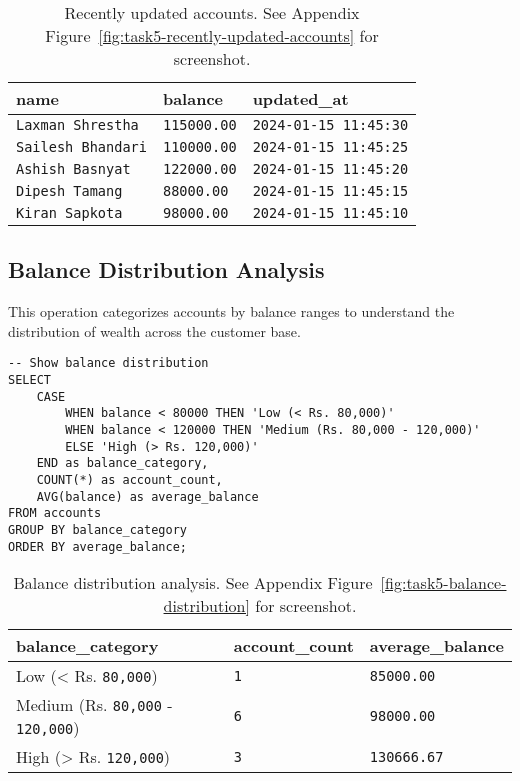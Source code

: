 \begin{table}[H]
  \centering
  \begin{tabular}{|l|l|l|}
    \hline
    \textbf{name} & \textbf{balance} & \textbf{updated\_at} \\
    \hline
    \texttt{Laxman Shrestha} & \texttt{115000.00} & \texttt{2024-01-15 11:45:30} \\
    \texttt{Sailesh Bhandari} & \texttt{110000.00} & \texttt{2024-01-15 11:45:25} \\
    \texttt{Ashish Basnyat} & \texttt{122000.00} & \texttt{2024-01-15 11:45:20} \\
    \texttt{Dipesh Tamang} & \texttt{88000.00} & \texttt{2024-01-15 11:45:15} \\
    \texttt{Kiran Sapkota} & \texttt{98000.00} & \texttt{2024-01-15 11:45:10} \\
    \hline
  \end{tabular}
  \caption{Recently updated accounts. See Appendix Figure~\ref{fig:task5-recently-updated-accounts} for screenshot.}
\end{table}

\subsection{Balance Distribution Analysis}
This operation categorizes accounts by balance ranges to understand the distribution of wealth across the customer base.

\begin{verbatim}
-- Show balance distribution
SELECT
    CASE
        WHEN balance < 80000 THEN 'Low (< Rs. 80,000)'
        WHEN balance < 120000 THEN 'Medium (Rs. 80,000 - 120,000)'
        ELSE 'High (> Rs. 120,000)'
    END as balance_category,
    COUNT(*) as account_count,
    AVG(balance) as average_balance
FROM accounts
GROUP BY balance_category
ORDER BY average_balance;
\end{verbatim}

\begin{table}[H]
  \centering
  \begin{tabular}{|l|l|l|}
    \hline
    \textbf{balance\_category} & \textbf{account\_count} & \textbf{average\_balance} \\
    \hline
    Low (< Rs. \texttt{80,000}) & \texttt{1} & \texttt{85000.00} \\
    Medium (Rs. \texttt{80,000} - \texttt{120,000}) & \texttt{6} & \texttt{98000.00} \\
    High (> Rs. \texttt{120,000}) & \texttt{3} & \texttt{130666.67} \\
    \hline
  \end{tabular}
  \caption{Balance distribution analysis. See Appendix Figure~\ref{fig:task5-balance-distribution} for screenshot.}
\end{table}

